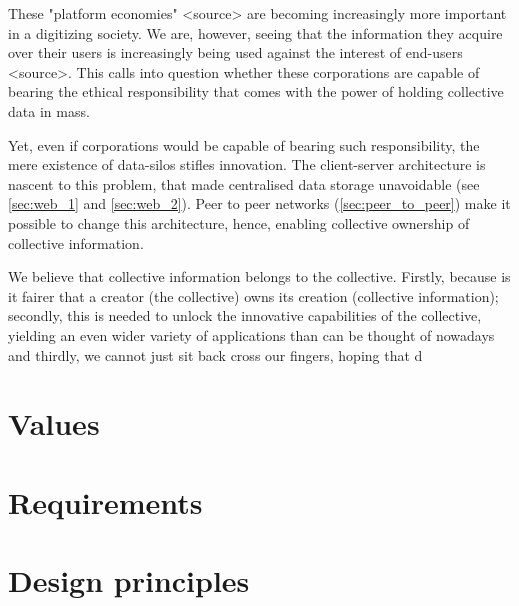 These "platform economies" <source> are becoming increasingly more important in a digitizing society. We are, however, seeing that the information they acquire over their users is increasingly being used against the interest of end-users <source>. This calls into question whether these corporations are capable of bearing the ethical responsibility that comes with the power of holding collective data in mass.

Yet, even if corporations would be capable of bearing such responsibility, the mere existence of data-silos stifles innovation. The client-server architecture is nascent to this problem, that made centralised data storage unavoidable (see \ref{sec:web_1} and \ref{sec:web_2}). Peer to peer networks (\ref{sec:peer_to_peer}) make it possible to change this architecture, hence, enabling collective ownership of collective information. 

We believe that collective information belongs to the collective. Firstly, because is it fairer that a creator (the collective) owns its creation (collective information); secondly, this is needed to unlock the innovative capabilities of the collective, yielding an even wider variety of applications than can be thought of nowadays and thirdly, we cannot just sit back cross our fingers, hoping that d

\section{Values}\label{sec:values}

\section{Requirements}

\section{Design principles}\label{sec:design-principles}

